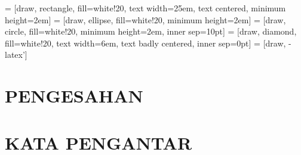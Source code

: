 \documentclass[12pt, a4paper, onecolumn, oneside, final]{report}
\theoremstyle{definition}
\numberwithin{equation}{chapter}
\begin{document}
 = [draw, rectangle, fill=white!20, text width=25em, text centered, minimum height=2em]%
 = [draw, ellipse, fill=white!20, minimum height=2em]
 = [draw, circle, fill=white!20, minimum height=2em, inner sep=10pt]
 = [draw, diamond, fill=white!20, text width=6em, text badly centered, inner sep=0pt]
 = [draw, -latex']

\pagebreak
\chapter*{PENGESAHAN}

%
%
%
\pagebreak
\chapter*{KATA PENGANTAR}	

\pagebreak
\end{document}
